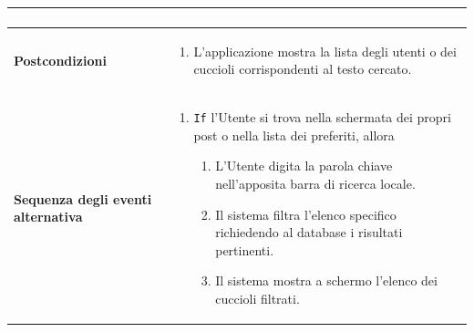\documentclass[a4paper]{report}
\begin{document}
\begin{table}[H]
\begin{tabular}{|p{3.9cm}|p{9.9cm}|}
\begin{enumerate}[leftmargin=14pt,label=\arabic*.,labelsep=0.5em,topsep=0pt,partopsep=0pt,parsep=0pt,itemsep=0pt]
\end{enumerate}\\ \hline
\textbf{Postcondizioni} &
\begin{enumerate}[leftmargin=14pt,label=\arabic*.,labelsep=0.5em,topsep=0pt,partopsep=0pt,parsep=0pt,itemsep=0pt]
\item L'applicazione mostra la lista degli utenti o dei cuccioli corrispondenti al testo cercato.
\end{enumerate} \\ \hline
\textbf{Sequenza degli eventi alternativa} & \begin{enumerate}[leftmargin=14pt,label=\arabic*.,labelsep=0.5em,topsep=0pt,partopsep=0pt,parsep=0pt,itemsep=0pt]
   \item \texttt{If} l'Utente si trova nella schermata dei propri post o nella lista dei preferiti, allora
   \begin{enumerate}[label=\arabic{enumi}.\arabic*.,leftmargin=22pt,labelsep=0.5em,topsep=0pt,partopsep=0pt,parsep=0pt,itemsep=0pt]
       \item L'Utente digita la parola chiave nell'apposita barra di ricerca locale.
       \item Il sistema filtra l'elenco specifico richiedendo al database i risultati pertinenti.
       \item Il sistema mostra a schermo l'elenco dei cuccioli filtrati.
   \end{enumerate}
\end{enumerate}\\ \hline
\end{tabular}
\end{table}
\end{document}
